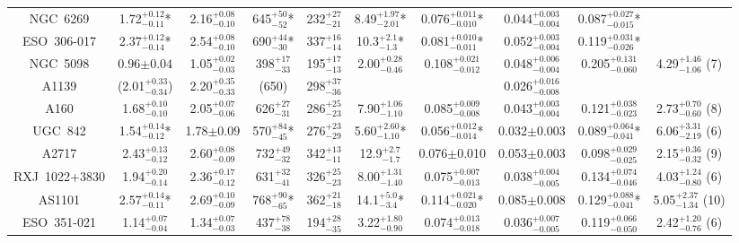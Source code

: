 \begin{table}
\begin{center}
{\begin{tabular}{cccccccccc}
    NGC~6269 & 1.72$^{+0.12}_{-0.11}$* & 2.16$^{+0.08}_{-0.10}$ & 645$^{+50}_{-52}$* & 232$^{+27}_{-21}$ & 8.49$^{+1.97}_{-2.01}$* & 0.076$^{+0.011}_{-0.010}$* & 0.044$^{+0.003}_{-0.004}$ & 0.087$^{+0.027}_{-0.015}$* & \\
    ESO~306-017 & 2.37$^{+0.12}_{-0.14}$* & 2.54$^{+0.08}_{-0.10}$ & 690$^{+44}_{-30}$* & 337$^{+16}_{-14}$ & 10.3$^{+2.1}_{-1.3}$* & 0.081$^{+0.010}_{-0.011}$* & 0.052$^{+0.003}_{-0.004}$ & 0.119$^{+0.031}_{-0.026}$* & \\
    NGC~5098 & 0.96$\pm0.04$ & 1.05$^{+0.02}_{-0.03}$ & 398$^{+17}_{-33}$ & 195$^{+17}_{-13}$ & 2.00$^{+0.28}_{-0.46}$ & 0.108$^{+0.021}_{-0.012}$ & 0.048$^{+0.006}_{-0.004}$ & 0.205$^{+0.131}_{-0.060}$ & 4.29$^{+1.46}_{-1.06}$ (7) \\
    A1139 & (2.01$^{+0.33}_{-0.34}$) & 2.20$^{+0.35}_{-0.33}$ & (650) & 298$^{+37}_{-36}$ & & & 0.026$^{+0.016}_{-0.008}$ & & \\
    A160  & 1.68$^{+0.10}_{-0.10}$ & 2.05$^{+0.07}_{-0.06}$ & 626$^{+27}_{-31}$ & 286$^{+25}_{-23}$ & 7.90$^{+1.06}_{-1.10}$ & 0.085$^{+0.009}_{-0.008}$ & 0.043$^{+0.003}_{-0.004}$ & 0.121$^{+0.038}_{-0.023}$ & 2.73$^{+0.70}_{-0.60}$ (8) \\
    UGC~842  & 1.54$^{+0.14}_{-0.12}$* & 1.78$\pm0.09$ & 570$^{+84}_{-45}$* & 276$^{+23}_{-29}$ & 5.60$^{+2.60}_{-1.10}$* & 0.056$^{+0.012}_{-0.014}$* & 0.032$\pm$0.003 & 0.089$^{+0.064}_{-0.041}$* & 6.06$^{+3.31}_{-2.19}$ (6) \\
    A2717 & 2.43$^{+0.13}_{-0.12}$ & 2.60$^{+0.08}_{-0.09}$ & 732$^{+49}_{-32}$ & 342$^{+13}_{-11}$ & 12.9$^{+2.7}_{-1.7}$ & 0.076$\pm$0.010 & 0.053$\pm$0.003 & 0.098$^{+0.029}_{-0.025}$ & 2.15$^{+0.36}_{-0.32}$ (9) \\
    RXJ~1022+3830 & 1.94$^{+0.20}_{-0.14}$ & 2.36$^{+0.17}_{-0.12}$ & 631$^{+32}_{-41}$ & 326$^{+25}_{-23}$ & 8.00$^{+1.31}_{-1.40}$ & 0.075$^{+0.007}_{-0.013}$ & 0.038$^{+0.004}_{-0.005}$ & 0.134$^{+0.074}_{-0.046}$ & 4.03$^{+1.24}_{-0.80}$ (6) \\
    AS1101   & 2.57$^{+0.14}_{-0.11}$* & 2.69$^{+0.10}_{-0.09}$ & 768$^{+90}_{-65}$* & 362$^{+21}_{-18}$ & 14.1$^{+5.0}_{-3.4}$* & 0.114$^{+0.021}_{-0.020}$* & 0.085$\pm$0.008 & 0.129$^{+0.088}_{-0.041}$* & 5.05$^{+2.37}_{-1.34}$ (10) \\
    ESO~351-021 & 1.14$^{+0.07}_{-0.04}$ & 1.34$^{+0.07}_{-0.03}$ & 437$^{+78}_{-38}$ & 194$^{+28}_{-35}$ & 3.22$^{+1.80}_{-0.90}$ & 0.074$^{+0.013}_{-0.018}$ & 0.036$^{+0.007}_{-0.005}$ & 0.119$^{+0.066}_{-0.050}$ & 2.42$^{+1.20}_{-0.76}$ (6) \\

\end{tabular}}
\end{center}
\end{table}
